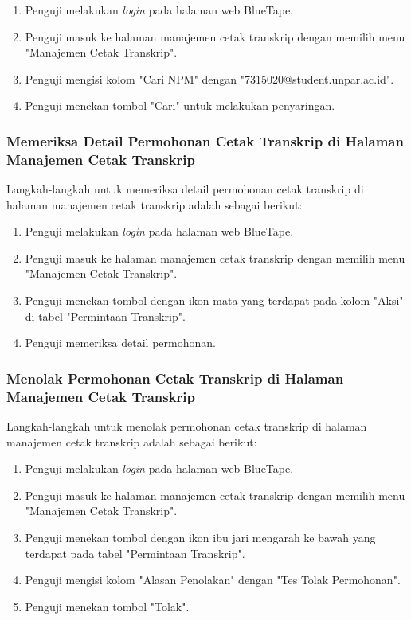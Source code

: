 \begin{enumerate}
    \item Penguji melakukan \textit{login} pada halaman web BlueTape.
    \item Penguji masuk ke halaman manajemen cetak transkrip dengan memilih menu "Manajemen Cetak Transkrip".
    \item Penguji mengisi kolom "Cari NPM" dengan "7315020@student.unpar.ac.id".
    \item Penguji menekan tombol "Cari" untuk melakukan penyaringan.
\end{enumerate}

\subsubsection{Memeriksa Detail Permohonan Cetak Transkrip di Halaman Manajemen Cetak Transkrip}
\label{subsubsec:skenario_memeriksa_detail_permohonan_cetak_transkrip_di_halaman_manajemen_cetak_transkrip}
Langkah-langkah untuk memeriksa detail permohonan cetak transkrip di halaman manajemen cetak transkrip adalah sebagai berikut:

\begin{enumerate}
    \item Penguji melakukan \textit{login} pada halaman web BlueTape.
    \item Penguji masuk ke halaman manajemen cetak transkrip dengan memilih menu "Manajemen Cetak Transkrip".
    \item Penguji menekan tombol dengan ikon mata yang terdapat pada kolom "Aksi" di tabel "Permintaan Transkrip".
    \item Penguji memeriksa detail permohonan.
\end{enumerate}

\subsubsection{Menolak Permohonan Cetak Transkrip di Halaman Manajemen Cetak Transkrip}
\label{subsubsec:skenario_menolak_permohonan_cetak_transkrip_di_halaman_manajemen_cetak_transkrip}
Langkah-langkah untuk menolak permohonan cetak transkrip di halaman manajemen cetak transkrip adalah sebagai berikut:

\begin{enumerate}
    \item Penguji melakukan \textit{login} pada halaman web BlueTape.
    \item Penguji masuk ke halaman manajemen cetak transkrip dengan memilih menu "Manajemen Cetak Transkrip".
    \item Penguji menekan tombol dengan ikon ibu jari mengarah ke bawah yang terdapat pada tabel "Permintaan Transkrip".
    \item Penguji mengisi kolom "Alasan Penolakan" dengan "Tes Tolak Permohonan".
    \item Penguji menekan tombol "Tolak".
\end{enumerate}

